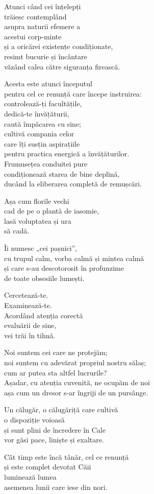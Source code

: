 Atunci când cei înțelepți\\
trăiesc contemplând\\
asupra naturii efemere a\\
acestui corp-minte\\
și a oricărei existențe condiționate,\\
resimt bucurie și încântare\\
văzând calea către siguranța firească.


Acesta este atunci începutul\\
pentru cel ce renunță care începe instruirea:\\
controlează-ți facultățile,\\
dedică-te învățăturii,\\
caută împăcarea cu sine;\\
cultivă compania celor\\
care îți susțin aspirațiile\\
pentru practica energică a învățăturilor.\\
Frumusețea conduitei pure\\
condiționează starea de bine deplină,\\
ducând la eliberarea completă de remușcări.


Așa cum florile vechi\\
cad de pe o plantă de iasomie,\\
lasă voluptatea și ura\\
să cadă.


Îi numesc „cei pașnici”,\\
cu trupul calm, vorba calmă și mintea calmă\\
și care s-au descotorosit în profunzime\\
de toate obsesiile lumești.


Cercetează-te.\\
Examinează-te.\\
Acordând atenția corectă\\
evaluării de sine,\\
vei trăi în tihnă.


Noi suntem cei care ne protejăm;\\
noi suntem cu adevărat propriul nostru sălaș;\\
cum ar putea sta altfel lucrurile?\\
Așadar, cu atenția cuvenită, ne ocupăm de noi\\
așa cum un dresor s-ar îngriji de un pursânge.

Un călugăr, o călugăriță care cultivă\\
o dispoziție voioasă\\
și sunt plini de încredere în Cale\\
vor găsi pace, liniște și exaltare.


Cât timp este încă tânăr, cel ce renunță\\
și este complet devotat Căii\\
luminează lumea\\
asemenea lunii care iese din nori.

